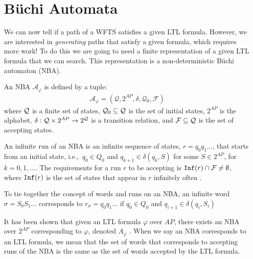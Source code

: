 \section{B\"{u}chi Automata}
We can now tell if a path of a WFTS satisfies a given LTL formula. However, we are interested in \textit{generating} paths that satisfy a given formula, which requires more work! To do this we are going to need a finite representation of a given LTL formula that we can search. This representation is a non-deterministic B\"{u}chi automaton (NBA). 
\begin{definition}
\label{defNBA}
An NBA $\mathcal{A}_\varphi$ is defined by a tuple:
\begin{align*}
\mathcal{A}_\varphi = (\mathcal{Q},2^{AP},\delta,\mathcal{Q}_0,\mathcal{F})
\end{align*}
where $\mathcal{Q}$ is a finite set of states, $\mathcal{Q}_0 \subseteq \mathcal{Q}$ is the set of initial states, $2^{AP}$ is the alphabet, $\delta: \mathcal{Q} \times 2^{AP} \rightarrow 2^{\mathcal{Q}}$ is a transition relation, and $\mathcal{F} \subseteq \mathcal{Q}$ is the set of accepting states.
\end{definition} 
An infinite run of an NBA is an infinite sequence of states, $r=q_0 q_1 \dots$, that starts from an initial state, i.e.,\ $q_0 \in Q_0$ and $q_{k+1} \in \delta(q_k, S)$ for some $S \in 2^{AP}$, for $k = 0,1,\dots$. The requirements for a run $r$ to be accepting is $\texttt{Inf}(r) \cap \mathcal{F} \neq \emptyset$, where $\texttt{Inf}(r)$ is the set of states that appear in $r$ infinitely often \cite{guo15}. 

To tie together the concept of words and runs on an NBA, an infinite word $\sigma = S_0 S_1 \dots$ corresponds to $r_\sigma = q_0 q_1 \dots$ if $q_0 \in Q_0$ and $q_{i+1} \in \delta(q_i,S_i)$

It has been shown that given an LTL formula $\varphi$ over $AP$, there exists an NBA over $2^{AP}$ corresponding to $\varphi$, denoted $A_\varphi$ \cite{baier08}. When we say an NBA corresponds to an LTL formula, we mean that the set of words that corresponds to accepting runs of the NBA is the same as the set of words accepted by the LTL formula.  

